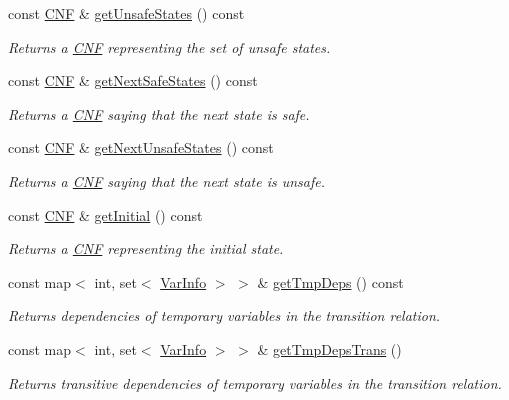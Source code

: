 \begin{DoxyCompactItemize}
const \hyperlink{classCNF}{C\-N\-F} \& \hyperlink{classAIG2CNF_a7e6e6af6ac83605669918008b12d30e7}{get\-Unsafe\-States} () const 
\begin{DoxyCompactList}\small\item\em Returns a \hyperlink{classCNF}{C\-N\-F} representing the set of unsafe states. \end{DoxyCompactList}\item 
const \hyperlink{classCNF}{C\-N\-F} \& \hyperlink{classAIG2CNF_af04a7275b64d96d7c16c5c8c8668b93c}{get\-Next\-Safe\-States} () const 
\begin{DoxyCompactList}\small\item\em Returns a \hyperlink{classCNF}{C\-N\-F} saying that the next state is safe. \end{DoxyCompactList}\item 
const \hyperlink{classCNF}{C\-N\-F} \& \hyperlink{classAIG2CNF_a1bec5428f2f5f6efa41810a308ebbe1f}{get\-Next\-Unsafe\-States} () const 
\begin{DoxyCompactList}\small\item\em Returns a \hyperlink{classCNF}{C\-N\-F} saying that the next state is unsafe. \end{DoxyCompactList}\item 
const \hyperlink{classCNF}{C\-N\-F} \& \hyperlink{classAIG2CNF_ae20be327c24ca3ed7493b56a254d6a63}{get\-Initial} () const 
\begin{DoxyCompactList}\small\item\em Returns a \hyperlink{classCNF}{C\-N\-F} representing the initial state. \end{DoxyCompactList}\item 
const map$<$ int, set$<$ \hyperlink{classVarInfo}{Var\-Info} $>$ $>$ \& \hyperlink{classAIG2CNF_a3f4076dda7514fc3015867494be3aaac}{get\-Tmp\-Deps} () const 
\begin{DoxyCompactList}\small\item\em Returns dependencies of temporary variables in the transition relation. \end{DoxyCompactList}\item 
const map$<$ int, set$<$ \hyperlink{classVarInfo}{Var\-Info} $>$ $>$ \& \hyperlink{classAIG2CNF_a87d64a22868a17f6c3cf8dd3af88f02b}{get\-Tmp\-Deps\-Trans} ()
\begin{DoxyCompactList}\small\item\em Returns transitive dependencies of temporary variables in the transition relation. \end{DoxyCompactList}\end{DoxyCompactItemize}
